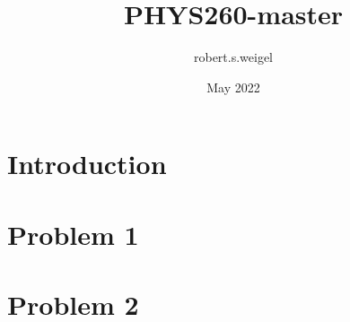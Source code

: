 \documentclass{article}
\title{PHYS260-master}
\author{robert.s.weigel }
\date{May 2022}
\begin{document}
\maketitle

\section{Introduction}
\section{Problem 1}
\section{Problem 2}
\end{document}
